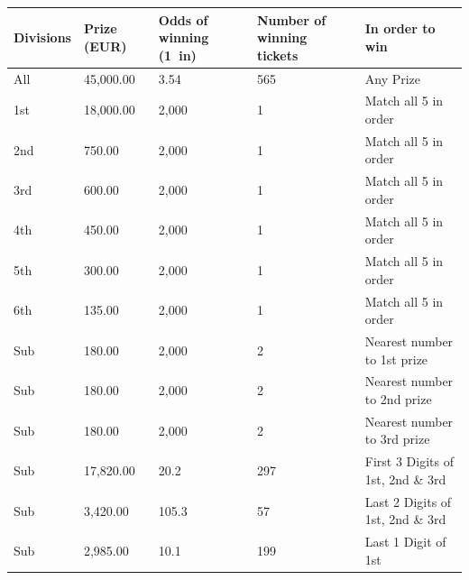 \documentclass{article}
\begin{document}
\begin{tabular}{lllll}
\toprule
Divisions & Prize (EUR) & Odds of winning (1 in) & Number of winning tickets & In order to win \\
\midrule
All & 45,000.00 & 3.54 & 565 & Any Prize \\
1st & 18,000.00 & 2,000 & 1 & Match all 5 in order \\
2nd & 750.00 & 2,000 & 1 & Match all 5 in order \\
3rd & 600.00 & 2,000 & 1 & Match all 5 in order \\
4th & 450.00 & 2,000 & 1 & Match all 5 in order \\
5th & 300.00 & 2,000 & 1 & Match all 5 in order \\
6th & 135.00 & 2,000 & 1 & Match all 5 in order \\
Sub & 180.00 & 2,000 & 2 & Nearest number to 1st prize \\
Sub & 180.00 & 2,000 & 2 & Nearest number to 2nd prize \\
Sub & 180.00 & 2,000 & 2 & Nearest number to 3rd prize \\
Sub & 17,820.00 & 20.2 & 297 & First 3 Digits of 1st, 2nd \& 3rd \\
Sub & 3,420.00 & 105.3 & 57 & Last 2 Digits of 1st, 2nd \& 3rd \\
Sub & 2,985.00 & 10.1 & 199 & Last 1 Digit of 1st \\
\bottomrule
\end{tabular}
\end{document}
